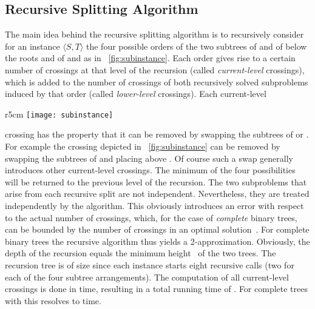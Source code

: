 \documentclass[runningheads,a4paper]{llncs}
\newcommand{\ttree}[1]{\ensuremath{\langle #1 \rangle}}
\begin{document}
\subsection{Recursive Splitting Algorithm}\label{sec:recurs-splitt-algo}

The main idea behind the recursive splitting algorithm is to
recursively consider for an instance \ttree{S,T} the four possible
orders of the two subtrees  of  and
 of  below the roots  and  of  and  as in
\figurename~\ref{fig:subinstance}.  Each order gives rise to a certain
number of crossings at that level of the recursion (called
\emph{current-level} crossings), which is added to the number of
crossings of both recursively solved subproblems induced by that order
(called \emph{lower-level} crossings). 
Each current-level 
\begin{wrapfigure}[11]{r}{5cm}
  \centering
  \vspace*{-4.5ex}
  \texttt{[image: subinstance]}
\caption{A subinstance \ttree{S,T} with a current-level crossing.}
  \label{fig:subinstance}
\end{wrapfigure} 
crossing has
the property that it can be removed by swapping the subtrees of 
or . For example the crossing depicted in
\figurename~\ref{fig:subinstance} can be removed by swapping the
subtrees of  and placing  above . Of course such a swap
generally introduces other current-level crossings. The minimum of the
four possibilities will be returned to the previous level of the
recursion. The two subproblems that arise from each recursive split
are not independent.  Nevertheless, they are treated independently by
the algorithm. This obviously introduces an error with respect to the actual
number of crossings, which, for the case of \emph{complete} binary
trees, can be bounded by the number of crossings in an optimal
solution~\cite{bbbnow-dbtha-08}.  For complete binary trees the
recursive algorithm thus yields a 2-approximation.  Obviously, the
depth of the recursion equals the minimum height~ of the two
trees. The recursion tree is of size  since each instance
starts eight recursive calls (two for each of the four subtree
arrangements). The computation of all current-level crossings is done in 
time, resulting in a total running time of .
For
complete trees with  this resolves to  time.
\end{document}
